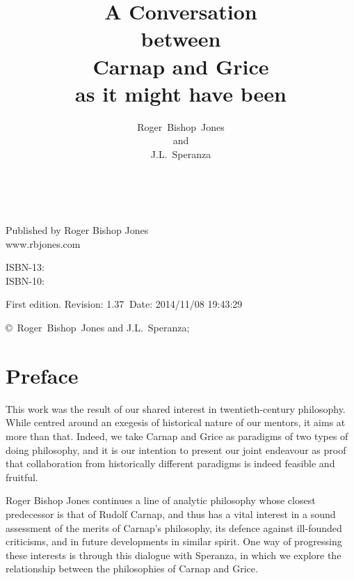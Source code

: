 \documentclass[10pt,titlepage]{book}
\title{A Conversation\\{\small between}\\Carnap and Grice\\{\small as it might have been}}
\author{Roger~Bishop~Jones\\\small{and}\\J.L.~Speranza}
\date{\ }
\begin{document}
\frontmatter
                               
\begin{titlepage}
\maketitle


\hspace{2in}

\vfill

\begin{centering}

Published by Roger Bishop Jones\\
www.rbjones.com\\
\vspace{0.2in}

ISBN-13: \\
ISBN-10: 

\vspace{0.2in}

{\footnotesize

First edition. $ $Revision: 1.37 $~$Date: 2014/11/08 19:43:29 $ $

\vspace{0.2in}

\copyright\ Roger~Bishop~Jones and J.L.~Speranza;

}%

\end{centering}


\thispagestyle{empty}
\end{titlepage}

\setcounter{tocdepth}{2}
{\parskip-0pt\tableofcontents}
\listoffigures

\mainmatter


\section*{Preface}
This work was the result of our shared interest in twentieth-century  
philosophy. While centred around an exegesis of historical nature of our  
mentors, it aims at more than that. Indeed, we take Carnap and Grice as paradigms 
of two types of doing philosophy, and it is our intention to present  our 
joint endeavour as proof that collaboration from historically different  
paradigms is indeed feasible and fruitful.
 
Roger Bishop Jones continues a line of analytic philosophy whose closest predecessor
is that of Rudolf Carnap, and thus has a vital interest in a sound assessment of the
merits of Carnap's philosophy, its defence against ill-founded criticisms, and in
future developments in similar spirit.
One way of progressing these interests is through this dialogue with Speranza,
in which we explore the relationship between the philosophies of Carnap and Grice.
\end{document}
